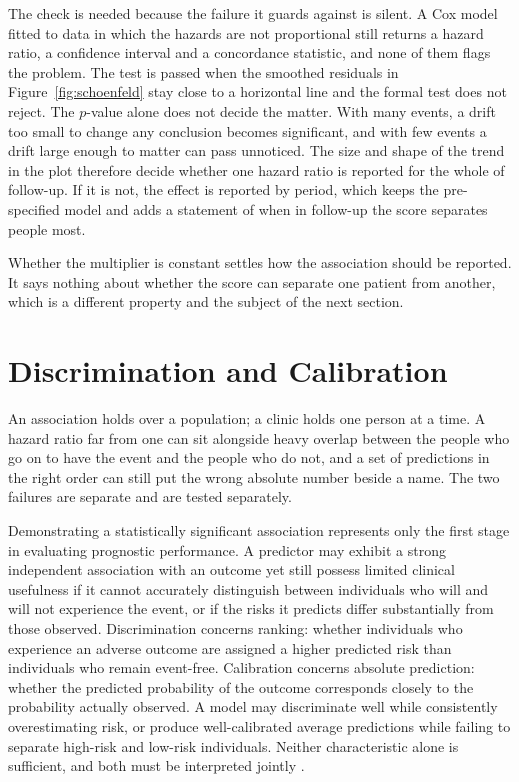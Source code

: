The check is needed because the failure it guards against is silent. A Cox model fitted to data in which the hazards are not proportional still returns a hazard ratio, a confidence interval and a concordance statistic, and none of them flags the problem. The test is passed when the smoothed residuals in Figure~\ref{fig:schoenfeld} stay close to a horizontal line and the formal test does not reject. The $p$-value alone does not decide the matter. With many events, a drift too small to change any conclusion becomes significant, and with few events a drift large enough to matter can pass unnoticed. The size and shape of the trend in the plot therefore decide whether one hazard ratio is reported for the whole of follow-up. If it is not, the effect is reported by period, which keeps the pre-specified model and adds a statement of when in follow-up the score separates people most.

\medskip
{}

\medskip
\noindent Whether the multiplier is constant settles how the association should be reported. It says nothing about whether the score can separate one patient from another, which is a different property and the subject of the next section.

\section{Discrimination and Calibration}
\label{sec:disccal}

\noindent An association holds over a population; a clinic holds one person at a time. A hazard ratio far from one can sit alongside heavy overlap between the people who go on to have the event and the people who do not, and a set of predictions in the right order can still put the wrong absolute number beside a name. The two failures are separate and are tested separately.

\noindent Demonstrating a statistically significant association represents only the first stage in evaluating prognostic performance. A predictor may exhibit a strong independent association with an outcome yet still possess limited clinical usefulness if it cannot accurately distinguish between individuals who will and will not experience the event, or if the risks it predicts differ substantially from those observed. Discrimination concerns ranking: whether individuals who experience an adverse outcome are assigned a higher predicted risk than individuals who remain event-free. Calibration concerns absolute prediction: whether the predicted probability of the outcome corresponds closely to the probability actually observed. A model may discriminate well while consistently overestimating risk, or produce well-calibrated average predictions while failing to separate high-risk and low-risk individuals. Neither characteristic alone is sufficient, and both must be interpreted jointly \citep{steyerberg_2019,vancalster_2019,collins_2015}.

